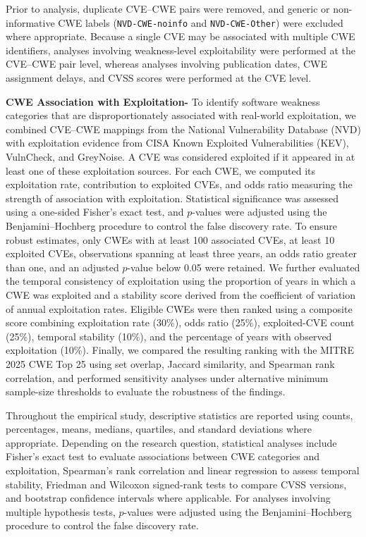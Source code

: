 \documentclass[conference,compsoc]{IEEEtran}
\begin{document}
Prior to analysis, duplicate CVE--CWE pairs were removed, and generic or non-informative CWE labels (\texttt{NVD-CWE-noinfo} and \texttt{NVD-CWE-Other}) were excluded where appropriate. Because a single CVE may be associated with multiple CWE identifiers, analyses involving weakness-level exploitability were performed at the CVE--CWE pair level, whereas analyses involving publication dates, CWE assignment delays, and CVSS scores were performed at the CVE level.


\textbf{CWE Association with Exploitation-} To identify software weakness categories that are disproportionately associated with real-world exploitation, we combined CVE--CWE mappings from the National Vulnerability Database (NVD) with exploitation evidence from CISA Known Exploited Vulnerabilities (KEV), VulnCheck, and GreyNoise. A CVE was considered exploited if it appeared in at least one of these exploitation sources. For each CWE, we computed its exploitation rate, contribution to exploited CVEs, and odds ratio measuring the strength of association with exploitation. Statistical significance was assessed using a one-sided Fisher's exact test, and $p$-values were adjusted using the Benjamini--Hochberg procedure to control the false discovery rate. To ensure robust estimates, only CWEs with at least 100 associated CVEs, at least 10 exploited CVEs, observations spanning at least three years, an odds ratio greater than one, and an adjusted $p$-value below 0.05 were retained. We further evaluated the temporal consistency of exploitation using the proportion of years in which a CWE was exploited and a stability score derived from the coefficient of variation of annual exploitation rates. Eligible CWEs were then ranked using a composite score combining exploitation rate (30\%), odds ratio (25\%), exploited-CVE count (25\%), temporal stability (10\%), and the percentage of years with observed exploitation (10\%). Finally, we compared the resulting ranking with the MITRE 2025 CWE Top 25 using set overlap, Jaccard similarity, and Spearman rank correlation, and performed sensitivity analyses under alternative minimum sample-size thresholds to evaluate the robustness of the findings.

Throughout the empirical study, descriptive statistics are reported using counts, percentages, means, medians, quartiles, and standard deviations where appropriate. Depending on the research question, statistical analyses include Fisher's exact test to evaluate associations between CWE categories and exploitation, Spearman's rank correlation and linear regression to assess temporal stability, Friedman and Wilcoxon signed-rank tests to compare CVSS versions, and bootstrap confidence intervals where applicable. For analyses involving multiple hypothesis tests, $p$-values were adjusted using the Benjamini--Hochberg procedure to control the false discovery rate.
\end{document}
